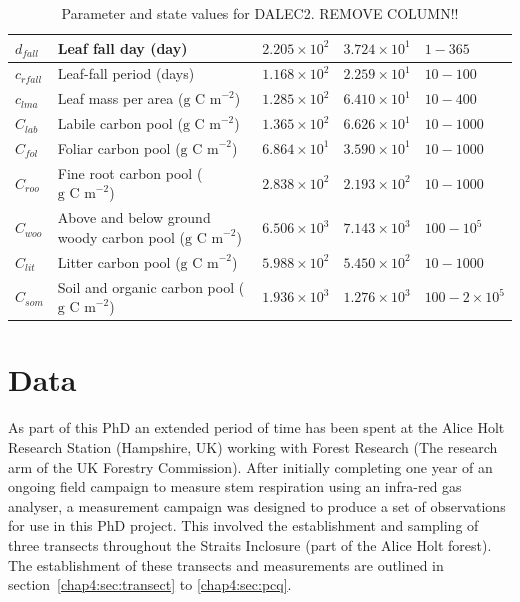 \begin{table}[ht]
\begin{center}
\begin{tabular}{| l | p{4.5cm} | p{1.7cm} | p{1.7cm} | p{1.7cm} |}
$d_{fall}$ & Leaf fall day (day) & $2.205\times 10^{2}$ & $3.724\times 10^{1}$ & $1 - 365$ \\ \hline
$c_{rfall}$ & Leaf-fall period (days) & $1.168\times 10^{2}$ & $2.259\times 10^{1}$ & $10 - 100$ \\ \hline
$c_{lma}$ & Leaf mass per area ($\text{g C m}^{-2}$) & $1.285\times 10^{2}$ & $6.410\times 10^{1}$ & $10 - 400$ \\ \hline
$C_{lab}$ & Labile carbon pool ($\text{g C m}^{-2}$) & $1.365\times 10^{2}$ & $6.626\times 10^{1}$ & $10 - 1000$ \\ \hline
$C_{fol}$ & Foliar carbon pool ($\text{g C m}^{-2}$) & $6.864\times 10^{1}$ & $3.590\times 10^{1}$ & $10 - 1000$ \\ \hline
$C_{roo}$ & Fine root carbon pool ($\text{g C m}^{-2}$) & $2.838\times 10^{2}$ & $2.193\times 10^{2}$ & $10 - 1000$ \\ \hline
$C_{woo}$ & Above and below ground woody carbon pool ($\text{g C m}^{-2}$) & $6.506\times 10^{3}$ & $7.143\times 10^{3}$ & $100 - 10^{5}$ \\ \hline
$C_{lit}$ & Litter carbon pool ($\text{g C m}^{-2}$) & $5.988\times 10^{2}$ & $5.450\times 10^{2}$ & $10 - 1000$ \\ \hline
$C_{som}$ & Soil and organic carbon pool ($\text{g C m}^{-2}$) & $1.936\times 10^{3}$ & $1.276\times 10^{3}$ & $100 - 2 \times 10^{5}$  \\ \hline
	\end{tabular}
	\caption{Parameter and state values for DALEC2. REMOVE COLUMN!!}
	\label{chap5:table:xbvars}
\end{center} 
\end{table}


\section{Data}

As part of this PhD an extended period of time has been spent at the Alice Holt Research Station (Hampshire, UK) working with Forest Research (The research arm of the UK Forestry Commission). After initially completing one year of an ongoing field campaign to measure stem respiration using an infra-red gas analyser, a measurement campaign was designed to produce a set of observations for use in this PhD project. This involved the establishment and sampling of three transects throughout the Straits Inclosure (part of the Alice Holt forest). The establishment of these transects and measurements are outlined in section~\ref{chap4:sec:transect} to \ref{chap4:sec:pcq}.

